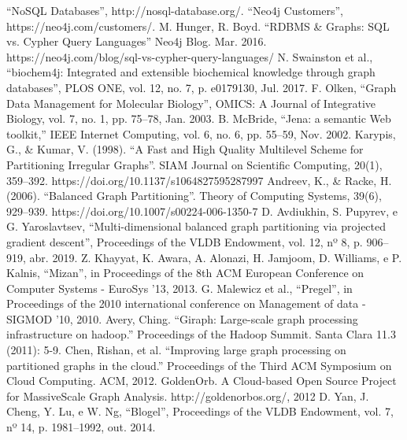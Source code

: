 \documentclass[conference]{IEEEtran}
\begin{document}
\begin{thebibliography}{00}
 ``NoSQL Databases'', http://nosql-database.org/.
 ``Neo4j Customers'',
    https://neo4j.com/customers/.
 M. Hunger, R. Boyd. ``RDBMS \& Graphs: SQL vs.
    Cypher Query Languages'' Neo4j Blog. Mar. 2016.
        https://neo4j.com/blog/sql-vs-cypher-query-languages/
 N. Swainston et al., ``biochem4j: Integrated and
    extensible biochemical knowledge through graph databases'', PLOS
        ONE, vol. 12, no. 7, p. e0179130, Jul. 2017.
 F. Olken, ``Graph Data Management for Molecular
    Biology'', OMICS: A Journal of Integrative Biology, vol. 7, no. 1,
        pp. 75–78, Jan. 2003.
 B. McBride, ``Jena: a semantic Web toolkit,” IEEE
    Internet Computing, vol. 6, no. 6, pp. 55–59, Nov. 2002.
 Karypis, G., \& Kumar, V. (1998). ``A Fast and High
    Quality Multilevel Scheme for Partitioning Irregular Graphs''. SIAM
        Journal on Scientific Computing, 20(1), 359–392.
        https://doi.org/10.1137/s1064827595287997
 Andreev, K., \& Racke, H. (2006). ``Balanced
    Graph Partitioning''. Theory of Computing Systems, 39(6), 929–939.
        https://doi.org/10.1007/s00224-006-1350-7
 D. Avdiukhin, S. Pupyrev, e G. Yaroslavtsev,
    ``Multi-dimensional balanced graph partitioning via projected
        gradient descent'', Proceedings of the VLDB Endowment, vol. 12,
        nº 8, p. 906–919, abr. 2019.
 Z. Khayyat, K. Awara, A. Alonazi, H. Jamjoom, D.
    Williams, e P. Kalnis, ``Mizan'', in Proceedings of the 8th ACM
        European Conference on Computer Systems - EuroSys ’13, 2013.
 G. Malewicz et al., ``Pregel'', in Proceedings of the
    2010 international conference on Management of data - SIGMOD ’10,
        2010.
 Avery, Ching. ``Giraph: Large-scale graph processing
    infrastructure on hadoop.'' Proceedings of the Hadoop Summit. Santa
        Clara 11.3 (2011): 5-9.
 Chen, Rishan, et al. ``Improving large graph processing
    on partitioned graphs in the cloud.'' Proceedings of the Third ACM
        Symposium on Cloud Computing. ACM, 2012.
 GoldenOrb. A Cloud-based Open Source Project for
    MassiveScale Graph Analysis. http://goldenorbos.org/, 2012
 D. Yan, J. Cheng, Y. Lu, e W. Ng, ``Blogel'',
    Proceedings of the VLDB Endowment, vol. 7, nº 14, p. 1981–1992, out.
        2014.


\end{thebibliography}
\end{document}
